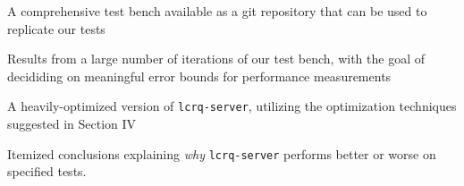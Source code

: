 \documentclass[twoside,10pt]{article}
\begin{document}
\begin{multicols}{2}
\begin{compactitem}
\item A comprehensive test bench available as a git repository that
  can be used to replicate our tests
\item Results from a large number of iterations of our test bench,
  with the goal of decididing on meaningful error bounds for
  performance measurements
\item A heavily-optimized version of \verb+lcrq-server+, utilizing the
  optimization techniques suggested in Section IV
\item Itemized conclusions explaining \emph{why} \verb+lcrq-server+
  performs better or worse on specified tests.
\end{compactitem}

\end{multicols}

{\small
  
  
}
\end{document}

